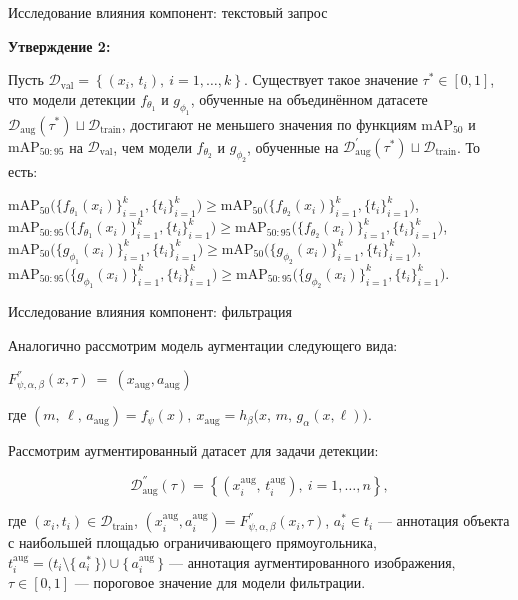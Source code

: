 \documentclass{beamer}
\begin{document}
\begin{frame}{Исследование влияния компонент: текстовый запрос}

\textbf{Утверждение 2:}\par

\small{
Пусть $\mathcal{D}_{\text{val}} =
\left\{
  (x_i,\,t_i), \
  i = 1,\dots,k
\right\}$. Существует такое значение $\tau^*\in[0,1]$, что модели детекции $f_{\theta_1}$ и $g_{\phi_1}$, обученные на объединённом датасете $\mathcal{D}_{\mathrm{aug}}(\tau^*)\sqcup\mathcal{D}_{\mathrm{train}}$, достигают не меньшего значения по функциям $\mathrm{mAP}_{50}$ и $\mathrm{mAP}_{50:95}$ на $\mathcal{D}_{\text{val}}$, чем модели $f_{\theta_2}$ и $g_{\phi_2}$, обученные на $\mathcal{D}^{'}_{\text{aug}}(\tau^{*}) \sqcup \mathcal{D}_{\text{train}}$. То есть:

\begin{center}
$\mathrm{mAP}_{50}\bigl(\{f_{\theta_1}(x_i)\}_{i=1}^k,\{t_i\}_{i=1}^k\bigr)\ge\mathrm{mAP}_{50}\bigl(\{f_{\theta_2}(x_i)\}_{i=1}^k,\{t_i\}_{i=1}^k\bigr)$,  
$\mathrm{mAP}_{50:95}\bigl(\{f_{\theta_1}(x_i)\}_{i=1}^k,\{t_i\}_{i=1}^k\bigr)\ge\mathrm{mAP}_{50:95}\bigl(\{f_{\theta_2}(x_i)\}_{i=1}^k,\{t_i\}_{i=1}^k\bigr)$,  
$\mathrm{mAP}_{50}\bigl(\{g_{\phi_1}(x_i)\}_{i=1}^k,\{t_i\}_{i=1}^k\bigr)\ge\mathrm{mAP}_{50}\bigl(\{g_{\phi_2}(x_i)\}_{i=1}^k,\{t_i\}_{i=1}^k\bigr)$,  
$\mathrm{mAP}_{50:95}\bigl(\{g_{\phi_1}(x_i)\}_{i=1}^k,\{t_i\}_{i=1}^k\bigr)\ge\mathrm{mAP}_{50:95}\bigl(\{g_{\phi_2}(x_i)\}_{i=1}^k,\{t_i\}_{i=1}^k\bigr)$.
\end{center}}

\end{frame}

\begin{frame}{Исследование влияния компонент: фильтрация}

Аналогично рассмотрим модель аугментации следующего вида:
\begin{center}
$F^{''}_{\psi,\alpha,\beta}(x, \tau) \ = \ (x_{\text{aug}}, a_{\text{aug}})$
\end{center}
где 
$ 
(m,\,\ell,\, a_{\text{aug}}) = f_{\psi}(x),  \ x_{\text{aug}} = h_{\beta}\bigl(x,\,m,\,g_{\alpha}(x, \ell)\bigr)$.

\begin{center}
Рассмотрим аугментированный датасет для задачи детекции:
\end{center}
\[
\mathcal{D}^{''}_{\text{aug}}(\tau) =
\left\{
  (x_i^{\text{aug}},\,t_i^{\text{aug}}), \
  i = 1,\dots,n
\right\},
\]

где $(x_i, t_i) \in \mathcal{D}_{\mathrm{train}}$,
$(x_i^{\mathrm{aug}}, a_i^{\mathrm{aug}}) = F^{''}_{\psi,\alpha,\beta}(x_i, \tau)$,
$a_i^* \in t_i$ — аннотация объекта с наибольшей площадью ограничивающего прямоугольника,
$t_i^{\mathrm{aug}} = \bigl(t_i \setminus \{\,a_i^*\,\}\bigr) \cup \{\,a_i^{\mathrm{aug}}\,\}$ — аннотация аугментированного изображения,
$\tau \in [0,1]$ — пороговое значение для модели фильтрации.


\end{frame}
\end{document}
